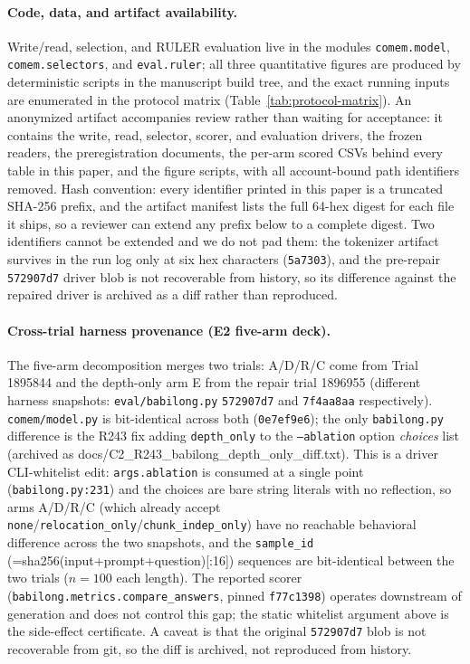 \FloatBarrier

\paragraph{Code, data, and artifact availability.}
Write/read, selection, and RULER evaluation live in the modules
\texttt{comem.model}, \texttt{comem.selectors}, and \texttt{eval.ruler};
all three quantitative figures are produced by deterministic scripts in the
manuscript build tree, and the exact running inputs are enumerated in the
protocol matrix (Table~\ref{tab:protocol-matrix}).  An anonymized artifact
accompanies review rather than waiting for acceptance: it contains the write,
read, selector, scorer, and evaluation drivers, the frozen readers, the
preregistration documents, the per-arm scored CSVs behind every table in this
paper, and the figure scripts, with all account-bound path identifiers removed.
Hash convention: every identifier printed in this paper is a truncated SHA-256
prefix, and the artifact manifest lists the full 64-hex digest for each file it
ships, so a reviewer can extend any prefix below to a complete digest.  Two
identifiers cannot be extended and we do not pad them: the tokenizer artifact
survives in the run log only at six hex characters (\texttt{5a7303}), and the
pre-repair \texttt{572907d7} driver blob is not recoverable from history, so its
difference against the repaired driver is archived as a diff rather than
reproduced.

\paragraph{Cross-trial harness provenance (E2 five-arm deck).}
The five-arm decomposition merges two trials: A/D/R/C come from Trial
1895844 and the depth-only arm E from the repair trial 1896955 (different
harness snapshots: \texttt{eval/babilong.py} \texttt{572907d7} and
\texttt{7f4aa8aa} respectively).  \texttt{comem/model.py} is bit-identical
across both (\texttt{0e7ef9e6}); the only \texttt{babilong.py} difference is
the R243 fix adding \texttt{depth\_only} to the \texttt{--ablation} option
\emph{choices} list (archived as docs/C2\_R243\_babilong\_depth\_only\_diff.txt).
This is a driver CLI-whitelist edit: \texttt{args.ablation} is consumed at a
single point (\texttt{babilong.py:231}) and the choices are bare string
literals with no reflection, so arms A/D/R/C (which already accept
\texttt{none}/\texttt{relocation\_only}/\texttt{chunk\_indep\_only}) have no
reachable behavioral difference across the two snapshots, and the
\texttt{sample\_id} (=sha256(input+prompt+question)[:16]) sequences are
bit-identical between the two trials ($n{=}100$ each length).  The reported
scorer (\texttt{babilong.metrics.compare\_answers}, pinned \texttt{f77c1398})
operates downstream of generation and does not control this gap; the static
whitelist argument above is the side-effect certificate.  A caveat is that the
original \texttt{572907d7} blob is not recoverable from git, so the diff is
archived, not reproduced from history.

